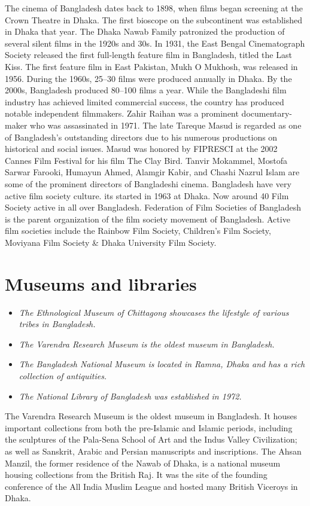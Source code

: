 The cinema of Bangladesh dates back to 1898, when films began screening
at the Crown Theatre in Dhaka. The first bioscope on the subcontinent
was established in Dhaka that year. The Dhaka Nawab Family patronized
the production of several silent films in the 1920s and 30s. In 1931,
the East Bengal Cinematograph Society released the first full-length
feature film in Bangladesh, titled the Last Kiss. The first feature film
in East Pakistan, Mukh O Mukhosh, was released in 1956. During the
1960s, 25--30 films were produced annually in Dhaka. By the 2000s,
Bangladesh produced 80--100 films a year. While the Bangladeshi film
industry has achieved limited commercial success, the country has
produced notable independent filmmakers. Zahir Raihan was a prominent
documentary-maker who was assassinated in 1971. The late Tareque Masud
is regarded as one of Bangladesh's outstanding directors due to his
numerous productions on historical and social issues. Masud was honored
by FIPRESCI at the 2002 Cannes Film Festival for his film The Clay Bird.
Tanvir Mokammel, Mostofa Sarwar Farooki, Humayun Ahmed, Alamgir Kabir,
and Chashi Nazrul Islam are some of the prominent directors of
Bangladeshi cinema. Bangladesh have very active film society culture.
its started in 1963 at Dhaka. Now around 40 Film Society active in all
over Bangladesh. Federation of Film Societies of Bangladesh is the
parent organization of the film society movement of Bangladesh. Active
film societies include the Rainbow Film Society, Children's Film
Society, Moviyana Film Society \& Dhaka University Film Society.

\section{Museums and libraries}\label{museums-and-libraries}

\begin{itemize}
\item
  \emph{The Ethnological Museum of Chittagong showcases the lifestyle of
  various tribes in Bangladesh.}
\item
  \emph{The Varendra Research Museum is the oldest museum in
  Bangladesh.}
\item
  \emph{The Bangladesh National Museum is located in Ramna, Dhaka and
  has a rich collection of antiquities.}
\item
  \emph{The National Library of Bangladesh was established in 1972.}
\end{itemize}

The Varendra Research Museum is the oldest museum in Bangladesh. It
houses important collections from both the pre-Islamic and Islamic
periods, including the sculptures of the Pala-Sena School of Art and the
Indus Valley Civilization; as well as Sanskrit, Arabic and Persian
manuscripts and inscriptions. The Ahsan Manzil, the former residence of
the Nawab of Dhaka, is a national museum housing collections from the
British Raj. It was the site of the founding conference of the All India
Muslim League and hosted many British Viceroys in Dhaka.

